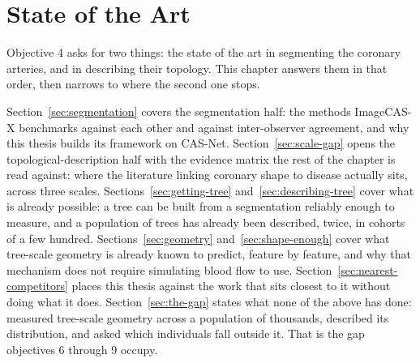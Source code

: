 
\chapter{State of the Art}
\label{ch:sota}

Objective 4 asks for two things: the state of the art in segmenting the coronary arteries, and in
describing their topology.
This chapter answers them in that order, then narrows to where the second one stops.

Section~\ref{sec:segmentation} covers the segmentation half: the methods ImageCAS-X benchmarks
against each other and against inter-observer agreement, and why this thesis builds its framework
on CAS-Net.
Section~\ref{sec:scale-gap} opens the topological-description half with the evidence matrix the
rest of the chapter is read against: where the literature linking coronary shape to disease actually
sits, across three scales.
Sections~\ref{sec:getting-tree} and~\ref{sec:describing-tree} cover what is already possible: a tree
can be built from a segmentation reliably enough to measure, and a population of trees has already
been described, twice, in cohorts of a few hundred.
Sections~\ref{sec:geometry} and~\ref{sec:shape-enough} cover what tree-scale geometry is already
known to predict, feature by feature, and why that mechanism does not require simulating blood flow
to use.
Section~\ref{sec:nearest-competitors} places this thesis against the work that sits closest to it
without doing what it does.
Section~\ref{sec:the-gap} states what none of the above has done: measured tree-scale geometry across
a population of thousands, described its distribution, and asked which individuals fall outside it.
That is the gap objectives 6 through 9 occupy.
